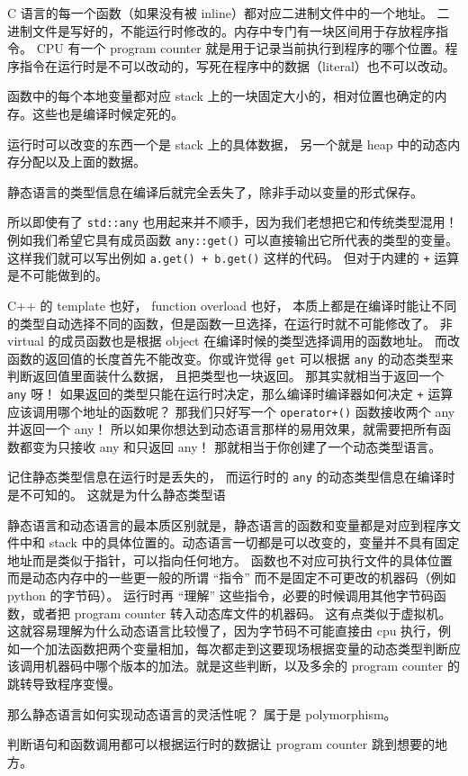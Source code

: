 
C 语言的每一个函数（如果没有被 inline）都对应二进制文件中的一个地址。 二进制文件是写好的，不能运行时修改的。内存中专门有一块区间用于存放程序指令。 CPU 有一个 program counter 就是用于记录当前执行到程序的哪个位置。程序指令在运行时是不可以改动的，写死在程序中的数据（literal）也不可以改动。

函数中的每个本地变量都对应 stack 上的一块固定大小的，相对位置也确定的内存。这些也是编译时候定死的。

运行时可以改变的东西一个是 stack 上的具体数据， 另一个就是 heap 中的动态内存分配以及上面的数据。

静态语言的类型信息在编译后就完全丢失了，除非手动以变量的形式保存。

所以即使有了 \verb`std::any` 也用起来并不顺手，因为我们老想把它和传统类型混用！例如我们希望它具有成员函数 \verb`any::get()` 可以直接输出它所代表的类型的变量。 这样我们就可以写出例如 \verb`a.get() + b.get()` 这样的代码。 但对于内建的 \verb`+` 运算是不可能做到的。

C++ 的 template 也好， function overload 也好， 本质上都是在编译时能让不同的类型自动选择不同的函数，但是函数一旦选择，在运行时就不可能修改了。 非 virtual 的成员函数也是根据 object 在编译时候的类型选择调用的函数地址。 而改函数的返回值的长度首先不能改变。你或许觉得 \verb`get` 可以根据 \verb`any` 的动态类型来判断返回值里面装什么数据， 且把类型也一块返回。 那其实就相当于返回一个 \verb`any` 呀！ 如果返回的类型只能在运行时决定，那么编译时编译器如何决定 \verb`+` 运算应该调用哪个地址的函数呢？ 那我们只好写一个 \verb`operator+()` 函数接收两个 any 并返回一个 any！ 所以如果你想达到动态语言那样的易用效果，就需要把所有函数都变为只接收 any 和只返回 any！ 那就相当于你创建了一个动态类型语言。

记住静态类型信息在运行时是丢失的， 而运行时的 \verb`any` 的动态类型信息在编译时是不可知的。 这就是为什么静态类型语

静态语言和动态语言的最本质区别就是，静态语言的函数和变量都是对应到程序文件中和 stack 中的具体位置的。动态语言一切都是可以改变的，变量并不具有固定地址而是类似于指针，可以指向任何地方。 函数也不对应可执行文件的具体位置而是动态内存中的一些更一般的所谓 “指令” 而不是固定不可更改的机器码（例如 python 的字节码）。 运行时再 “理解” 这些指令，必要的时候调用其他字节码函数，或者把 program counter 转入动态库文件的机器码。 这有点类似于虚拟机。 这就容易理解为什么动态语言比较慢了，因为字节码不可能直接由 cpu 执行，例如一个加法函数把两个变量相加，每次都走到这要现场根据变量的动态类型判断应该调用机器码中哪个版本的加法。就是这些判断，以及多余的 program counter 的跳转导致程序变慢。

那么静态语言如何实现动态语言的灵活性呢？ 属于是 polymorphism。

判断语句和函数调用都可以根据运行时的数据让 program counter 跳到想要的地方。


